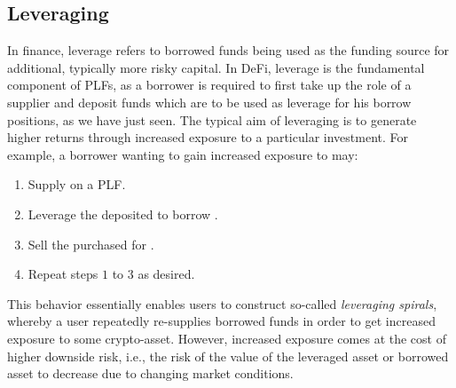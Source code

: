 \subsection{Leveraging}
In finance, leverage refers to borrowed funds being used as the funding source for additional, typically more risky capital.
In DeFi, leverage is the fundamental component of PLFs, as a borrower is required to first take up the role of a supplier and deposit funds which are to be used as leverage for his borrow positions, as we have just seen.
The typical aim of leveraging is to generate higher returns through increased exposure to a particular investment.
For example, a borrower wanting to gain increased exposure to  may:
\begin{enumerate}
\item Supply  on a PLF.
\item Leverage the deposited  to borrow .
\item Sell the purchased  for .
\item Repeat steps $1$ to $3$ as desired. 
\end{enumerate}

This behavior essentially enables users to construct so-called \textit{leveraging spirals}, whereby a user repeatedly re-supplies borrowed funds in order to get increased exposure to some crypto-asset. 
However, increased exposure comes at the cost of higher downside risk, i.e., the risk of the value of the leveraged asset or borrowed asset to decrease due to changing market conditions.

